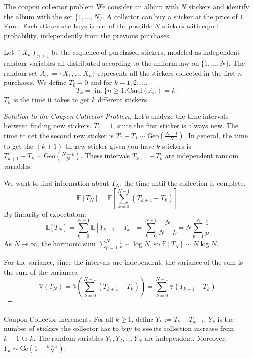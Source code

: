 \documentclass[11pt, a4paper]{article}
\begin{document}
\begin{problem}{The coupon collector problem}{}
We consider an album with $N$ stickers and identify the album with the set $\{1, \dots, N\}$. A collector can buy a sticker at the price of $1$ Euro. Each sticker she buys is one of the possible $N$ stickers with equal probability, independently from the previous purchases. 

Let $(X_n)_{n \ge 1}$ be the sequence of purchased stickers, modeled as independent random variables all distributed according to the uniform law on $\{1, \dots, N\}$. The random set $A_n := \{X_1, \dots, X_n\}$ represents all the stickers collected in the first $n$ purchases.
We define $T_0 = 0$ and for $k = 1, 2, \dots$,
\[ T_k = \inf\{n \ge 1 : \text{Card}(A_n) = k\} \]
$T_k$ is the time it takes to get $k$ different stickers.
\end{problem}

\begin{proof}[Solution to the Coupon Collector Problem]
Let's analyze the time intervals between finding new stickers.
$T_1 = 1$, since the first sticker is always new.
The time to get the second new sticker is $T_2 - T_1 \sim \text{Geo}\left(\frac{N-1}{N}\right)$.
In general, the time to get the $(k+1)$-th new sticker given you have $k$ stickers is $T_{k+1} - T_k \sim \text{Geo}\left(\frac{N-k}{N}\right)$.
These intervals $T_{k+1} - T_k$ are independent random variables.

We want to find information about $T_N$, the time until the collection is complete.
\[ \mathbb{E}[T_N] = \mathbb{E}\left[\sum_{k=0}^{N-1} (T_{k+1} - T_k)\right] \]
By linearity of expectation:
\[ \mathbb{E}[T_N] = \sum_{k=0}^{N-1} \mathbb{E}[T_{k+1} - T_k] = \sum_{k=0}^{N-1} \frac{N}{N-k} = N \sum_{p=1}^N \frac{1}{p} \]
As $N \to \infty$, the harmonic sum $\sum_{p=1}^N \frac{1}{p} \sim \log N$, so $\mathbb{E}[T_N] \sim N \log N$.

For the variance, since the intervals are independent, the variance of the sum is the sum of the variances:
\[ \mathbb{V}(T_N) = \mathbb{V}\left(\sum_{k=0}^{N-1} (T_{k+1} - T_k)\right) = \sum_{k=0}^{N-1} \mathbb{V}(T_{k+1} - T_k) \]
\end{proof}


\begin{lemma}{Coupon Collector increments}{} %
For all $k \ge 1$, define $Y_k := T_k - T_{k-1}$. $Y_k$ is the number of stickers the collector has to buy to see its collection increase from $k-1$ to $k$. %
The random variables $Y_1, Y_2, \dots, Y_N$ are independent. Moreover, $Y_k \sim \text{Ge}\left(1 - \frac{k-1}{N}\right)$. %
\end{lemma}
\end{document}
